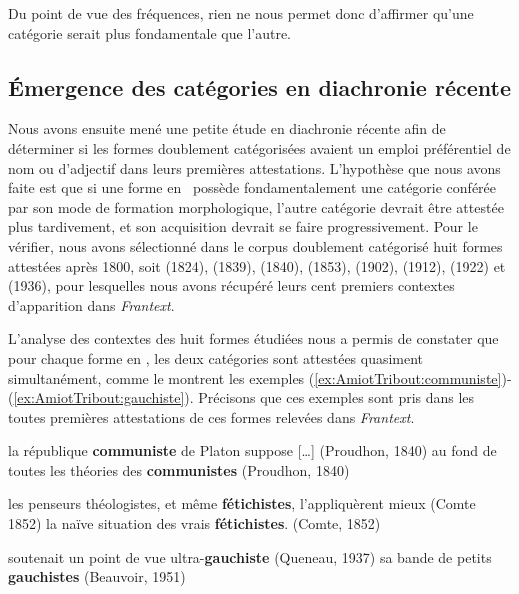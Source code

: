 \documentclass[output=paper]{LSP/langsci}
\begin{document}
Du point de vue des fréquences, rien ne nous permet donc d'affirmer qu'une catégorie serait plus fondamentale que l'autre. 


\subsection{Émergence des catégories en diachronie \textbf{récente}} \label{section:AmiotTribout:diachro}
Nous avons ensuite mené une petite étude en diachronie récente afin de déterminer si les  formes doublement catégorisées avaient un emploi préférentiel de nom ou d'adjectif dans leurs premières attestations. L'hypothèse que nous avons faite est que si une forme en \iste\ possède fondamentalement une catégorie conférée par son mode de formation morphologique, l'autre catégorie devrait être attestée plus tardivement, et son acquisition devrait se faire progressivement. Pour le vérifier, nous avons sélectionné dans le corpus doublement catégorisé huit formes attestées après 1800, soit  (1824),  (1839),  (1840),  (1853),  (1902),  (1912),  (1922) et  (1936), pour lesquelles nous avons récupéré leurs cent premiers contextes d'apparition dans \textit{Frantext}.

L'analyse des contextes des huit formes étudiées nous a permis de constater que pour chaque forme en \iste, les deux catégories sont attestées quasiment simultanément, comme le montrent les exemples (\ref{ex:AmiotTribout:communiste})-(\ref{ex:AmiotTribout:gauchiste}). Précisons que ces exemples sont pris dans les toutes premières attestations de ces formes relevées dans \textit{Frantext}.


\begin{exe}
\ex \label{ex:AmiotTribout:communiste}
\begin{xlist}
\ex \label{ex:AmiotTribout:communiste-A} la république \textbf{communiste} de Platon suppose [\ldots] (Proudhon, 1840)
\ex \label{ex:AmiotTribout:communiste-N} au fond de toutes les théories des \textbf{communistes} (Proudhon, 1840)
\end{xlist}

\ex \label{ex:AmiotTribout:fetichiste}
\begin{xlist}
\ex  les penseurs théologistes, et même \textbf{fétichistes}, l'appliquèrent mieux (Comte 1852)
\ex la naïve situation des vrais \textbf{fétichistes}. (Comte, 1852)
\end{xlist}

\ex \label{ex:AmiotTribout:gauchiste}
\begin{xlist}
\ex  soutenait un point de vue ultra-\textbf{gauchiste} (Queneau, 1937)
\ex  sa bande de petits \textbf{gauchistes} (Beauvoir, 1951)
\end{xlist}
\end{exe}
\end{document}
